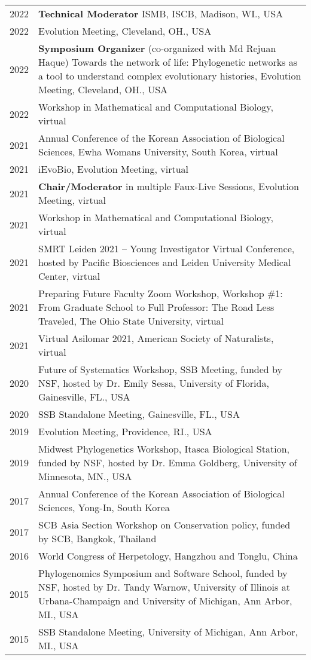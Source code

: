 \documentclass[11pt]{article}
\begin{document}
\begin{longtable}{p{}  p{}}

2022 &\textbf{Technical Moderator} ISMB, ISCB, Madison, WI., USA\\
2022 & Evolution Meeting, Cleveland, OH., USA\\
2022 & \textbf{Symposium Organizer} (co-organized with Md Rejuan Haque) Towards the network of life: Phylogenetic networks as a tool to understand complex evolutionary histories, Evolution Meeting, Cleveland, OH., USA\\
2022 & Workshop in Mathematical and Computational Biology, virtual\\
2021 & Annual Conference of the Korean Association of Biological Sciences, Ewha Womans University, South Korea, virtual\\
2021 & iEvoBio, Evolution Meeting, virtual\\
2021 & \textbf{Chair/Moderator} in multiple Faux-Live Sessions, Evolution Meeting, virtual\\
2021 & Workshop in Mathematical and Computational Biology, virtual\\
2021 & SMRT Leiden 2021 – Young Investigator Virtual Conference, hosted by Pacific Biosciences and Leiden University Medical Center, virtual\\
2021 & Preparing Future Faculty Zoom Workshop, Workshop \#1: From Graduate School to Full Professor: The Road Less Traveled, The Ohio State University, virtual\\
2021 & Virtual Asilomar 2021, American Society of Naturalists, virtual\\
2020 & Future of Systematics Workshop, SSB Meeting, funded by NSF, hosted by Dr. Emily Sessa, University of Florida, Gainesville, FL., USA\\
2020 & SSB Standalone Meeting, Gainesville, FL., USA\\
2019 & Evolution Meeting, Providence, RI., USA\\
2019 & Midwest Phylogenetics Workshop, Itasca Biological Station, funded by NSF, hosted by Dr. Emma Goldberg, University of Minnesota, MN., USA\\
2017 & Annual Conference of the Korean Association of Biological Sciences, Yong-In, South Korea\\
2017 & SCB Asia Section Workshop on Conservation policy, funded by SCB, Bangkok, Thailand\\
2016 & World Congress of Herpetology, Hangzhou and Tonglu, China\\
2015 & Phylogenomics Symposium and Software School, funded by NSF, hosted by Dr. Tandy Warnow, University of Illinois at Urbana-Champaign and University of Michigan, Ann Arbor, MI., USA\\
2015 & SSB Standalone Meeting, University of Michigan, Ann Arbor, MI., USA\vspace{5pt}\\
\end{longtable}
\end{document}
